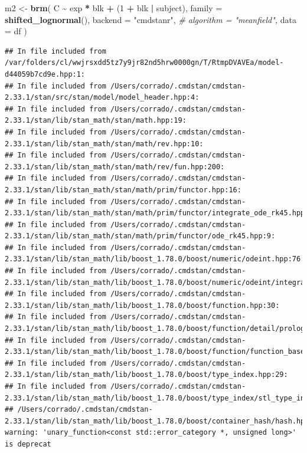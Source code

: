 \documentclass[
]{article}
\newenvironment{Shaded}{\begin{snugshade}}{\end{snugshade}}
\newcommand{\AttributeTok}[1]{\textcolor[rgb]{0.13,0.29,0.53}{#1}}
\newcommand{\CommentTok}[1]{\textcolor[rgb]{0.56,0.35,0.01}{\textit{#1}}}
\newcommand{\DecValTok}[1]{\textcolor[rgb]{0.00,0.00,0.81}{#1}}
\newcommand{\FunctionTok}[1]{\textcolor[rgb]{0.13,0.29,0.53}{\textbf{#1}}}
\newcommand{\NormalTok}[1]{#1}
\newcommand{\OtherTok}[1]{\textcolor[rgb]{0.56,0.35,0.01}{#1}}
\newcommand{\SpecialCharTok}[1]{\textcolor[rgb]{0.81,0.36,0.00}{\textbf{#1}}}
\newcommand{\StringTok}[1]{\textcolor[rgb]{0.31,0.60,0.02}{#1}}
\begin{document}
\begin{Shaded}
\begin{Highlighting}[]
\NormalTok{m2 }\OtherTok{\textless{}{-}} \FunctionTok{brm}\NormalTok{(}
\NormalTok{  C }\SpecialCharTok{\textasciitilde{}}\NormalTok{ exp }\SpecialCharTok{*}\NormalTok{ blk }\SpecialCharTok{+}\NormalTok{ (}\DecValTok{1} \SpecialCharTok{+}\NormalTok{ blk }\SpecialCharTok{|}\NormalTok{ subject),}
  \AttributeTok{family =} \FunctionTok{shifted\_lognormal}\NormalTok{(),}
  \AttributeTok{backend =} \StringTok{"cmdstanr"}\NormalTok{,}
  \CommentTok{\# algorithm = "meanfield",}
  \AttributeTok{data =}\NormalTok{ df}
\NormalTok{)}
\end{Highlighting}
\end{Shaded}

\begin{verbatim}
## In file included from /var/folders/cl/wwjrsxdd5tz7y9jr82nd5hrw0000gn/T/RtmpDVAVEa/model-d44059b7cd9e.hpp:1:
## In file included from /Users/corrado/.cmdstan/cmdstan-2.33.1/stan/src/stan/model/model_header.hpp:4:
## In file included from /Users/corrado/.cmdstan/cmdstan-2.33.1/stan/lib/stan_math/stan/math.hpp:19:
## In file included from /Users/corrado/.cmdstan/cmdstan-2.33.1/stan/lib/stan_math/stan/math/rev.hpp:10:
## In file included from /Users/corrado/.cmdstan/cmdstan-2.33.1/stan/lib/stan_math/stan/math/rev/fun.hpp:200:
## In file included from /Users/corrado/.cmdstan/cmdstan-2.33.1/stan/lib/stan_math/stan/math/prim/functor.hpp:16:
## In file included from /Users/corrado/.cmdstan/cmdstan-2.33.1/stan/lib/stan_math/stan/math/prim/functor/integrate_ode_rk45.hpp:6:
## In file included from /Users/corrado/.cmdstan/cmdstan-2.33.1/stan/lib/stan_math/stan/math/prim/functor/ode_rk45.hpp:9:
## In file included from /Users/corrado/.cmdstan/cmdstan-2.33.1/stan/lib/stan_math/lib/boost_1.78.0/boost/numeric/odeint.hpp:76:
## In file included from /Users/corrado/.cmdstan/cmdstan-2.33.1/stan/lib/stan_math/lib/boost_1.78.0/boost/numeric/odeint/integrate/observer_collection.hpp:23:
## In file included from /Users/corrado/.cmdstan/cmdstan-2.33.1/stan/lib/stan_math/lib/boost_1.78.0/boost/function.hpp:30:
## In file included from /Users/corrado/.cmdstan/cmdstan-2.33.1/stan/lib/stan_math/lib/boost_1.78.0/boost/function/detail/prologue.hpp:17:
## In file included from /Users/corrado/.cmdstan/cmdstan-2.33.1/stan/lib/stan_math/lib/boost_1.78.0/boost/function/function_base.hpp:21:
## In file included from /Users/corrado/.cmdstan/cmdstan-2.33.1/stan/lib/stan_math/lib/boost_1.78.0/boost/type_index.hpp:29:
## In file included from /Users/corrado/.cmdstan/cmdstan-2.33.1/stan/lib/stan_math/lib/boost_1.78.0/boost/type_index/stl_type_index.hpp:47:
## /Users/corrado/.cmdstan/cmdstan-2.33.1/stan/lib/stan_math/lib/boost_1.78.0/boost/container_hash/hash.hpp:132:33: warning: 'unary_function<const std::error_category *, unsigned long>' is deprecat
\end{verbatim}
\end{document}
